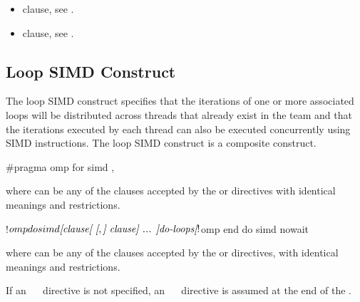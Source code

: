 \crossreferences
\begin{itemize}
\item {} clause, see
.

\item {} clause, see
.
\end{itemize}










\begin{samepage}
\subsection{Loop SIMD Construct}
\label{subsec:Loop SIMD Construct}
\summary
The loop SIMD construct specifies that the iterations of one or more associated loops will be distributed across threads that already exist in the team and that the iterations executed by each thread can also be executed concurrently using SIMD instructions. The loop SIMD construct is a composite construct.
\end{samepage}

\begin{samepage}
\syntax
\begin{ccppspecific}
\begin{ompcPragma}
#pragma omp for simd \plc{[clause[ [},\plc{] clause] ... ] new-line}
\end{ompcPragma}

where  can be any of the clauses accepted by the  or  directives with
identical meanings and restrictions.
\end{ccppspecific}
\end{samepage}

\begin{fortranspecific}
\begin{ompfPragma}
!$omp do simd \plc{[clause[ [},\plc{] clause] ... ]}
   \plc{do-loops}
\plc{[}!$omp end do simd \plc{[}nowait\plc{] ]}
\end{ompfPragma}

where  can be any of the clauses accepted by the  or  directives, with
identical meanings and restrictions.

If an ~~ directive is not specified, an ~~ directive is
assumed at the end of the .
\end{fortranspecific}

